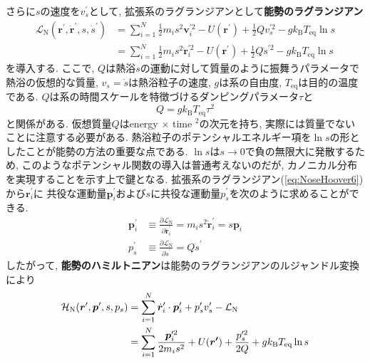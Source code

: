 さらに$s$の速度を$v^{\prime}_{s}$として, 拡張系のラグランジアンとして\textbf{能勢のラグランジアン}
\begin{align}
  \mathcal{L}_{\mathrm{N}}
  (\bm{r}^{\prime},\dot{\bm{r}}^{\prime}, s, \dot{s}^{\prime})
  &=
  \sum_{i=1}^{N}
  \frac{1}{2} m_{i} s^{2} {\bm{v}_{i}^{\prime 2}}
  - U(\bm{r}^{\prime})
  + \frac{1}{2} Q v_{s}^{\prime 2}
  - g k_{\mathrm{B}}T_{\mathrm{eq}} \ln s
  \\
  &=
  \sum_{i=1}^{N}
  \frac{1}{2} m_{i} s^{2} {\dot{\bm{r}}_{i}^{\prime 2}}
  - U(\bm{r}^{\prime})
  + \frac{1}{2} Q \dot{s}^{\prime 2}
  - g k_{\mathrm{B}}T_{\mathrm{eq}} \ln s
  \label{eq:NoseHoover6}
\end{align}
を導入する.
ここで, $Q$は熱浴$s$の運動に対して質量のように振舞うパラメータで熱浴の仮想的な質量, $v_{s} = \dot{s}$は熱浴粒子の速度, $g$は系の自由度, $T_{\mathrm{eq}}$は目的の温度である.
$Q$は系の時間スケールを特徴づけるダンピングパラメータ$\tau$と
\begin{equation}
 Q = gk_{\mathrm{B}}T_{\mathrm{eq}} \tau^{2}
\end{equation}
と関係がある.
仮想質量$Q$はenergy $\times$ time $^{2}$の次元を持ち, 実際には質量でないことに注意する必要がある.
熱浴粒子のポテンシャルエネルギー項を$\ln s$の形としたことが能勢の方法の重要な点である.  $\ln s$は$s \to 0$で負の無限大に発散するため, このようなポテンシャル関数の導入は普通考えないのだが, カノニカル分布を実現することを示す上で鍵となる.
拡張系のラグランジアン(\ref{eq:NoseHoover6})から$\bm{r}^{\prime}_{i}$に
共役な運動量$\bm{p}^{\prime}_{i}$および$s$に共役な運動量$p^{\prime}_{s}$を次のように求めることができる.
\begin{align}
  \bm{p}^{\prime}_{i}
  &\equiv
  \frac{\partial \mathcal{L}_{\mathrm{N}}}
       {\partial \dot{\bm{r}}^{\prime}_{i}}
  = m_{i} s^{2} \dot{\bm{r}}^{\prime}_{i}
  = s \bm{p}_{i}
  \label{eq:NoseHoover7.1}
  \\
  p^{\prime}_{s}
  &\equiv
  \frac{\partial \mathcal{L}_{\mathrm{N}}}
       {\partial \dot{s}^{\prime}} = Q \dot{s}^{\prime}
  \label{eq:NoseHoover7.2}
\end{align}
したがって, \textbf{能勢のハミルトニアン}は能勢のラグランジアンのルジャンドル変換により
\begin{align}
 \mathcal{H}_{\mathrm{N}}
 (\bm{r}^{\prime}, \bm{p}^{\prime}, s, p_{s})
 &=
 \sum_{i=1}^{N} \dot{\bm{r}}^{\prime}_{i} \cdot \bm{p}^{\prime}_{i}
 + p^{\prime}_{s} v^{\prime}_{s} - \mathcal{L}_{\mathrm{N}}
 \notag
 \\
 &= \sum_{i=1}^{N} \frac{\bm{p}_{i}^{\prime 2}}{2 m_{i} s^{2}}
  + U(\bm{r^{\prime}})
  + \frac{p_{s}^{\prime 2}}{2Q}
  + g k_{\mathrm{B}}T_{\mathrm{eq}} \ln s
 \label{Eq:Hamiltonian-Nose}
\end{align}
